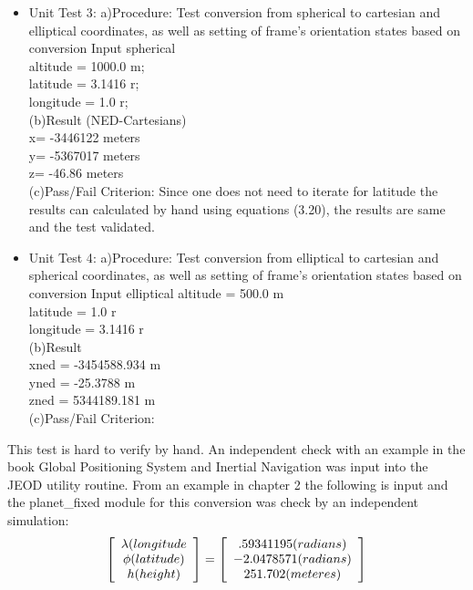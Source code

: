 \documentclass[twoside,11pt,titlepage]{report}
\begin{document}
\begin{itemize}
\item{Unit Test 3}: \label{unit6} \newline
a)Procedure:\newline
Test conversion from spherical to cartesian and elliptical coordinates, as
well as setting of frame's orientation states based on conversion
Input spherical\\
altitude = 1000.0 m;\\
latitude = 3.1416 r;\\
longitude = 1.0 r;\\
(b)Result (NED-Cartesians)\\
x= -3446122 meters \\
y= -5367017  meters\\
z= -46.86 meters \\
(c){Pass/Fail Criterion}:\newline
Since one does not need to iterate for latitude the results can calculated by hand
using equations (3.20), the results are same and the test validated.

\item{Unit Test 4}: \label{unit7} \newline
a)Procedure:\newline
Test conversion from elliptical to cartesian and spherical coordinates, as
well as setting of frame's orientation states based on conversion
Input elliptical
altitude = 500.0 m \\
latitude = 1.0 r \\
longitude = 3.1416 r\\
(b)Result\\
xned = -3454588.934 m \\
yned = -25.3788 m \\
zned = 5344189.181 m \\

(c){Pass/Fail Criterion}:
\end{itemize}
This test is hard to verify by hand.
An independent check with an example in the book Global Positioning System and Inertial Navigation \cite{far}
was input into the JEOD utility routine. From an example in chapter 2 the following is input and the planet\_fixed
module for this conversion was check by an independent simulation:
\begin{equation}
\left[ {\begin{array}{*{20}c}
   {\lambda (longitude}  \\
   {\phi (latitude)}  \\
   {h(height)}  \\
\end{array}} \right] = \left[ {\begin{array}{*{20}c}
   {.59341195(radians)}  \\
   { - 2.0478571(radians)}  \\
   {251.702(meteres)}  \\
\end{array}} \right]
\end{equation}
\end{document}
